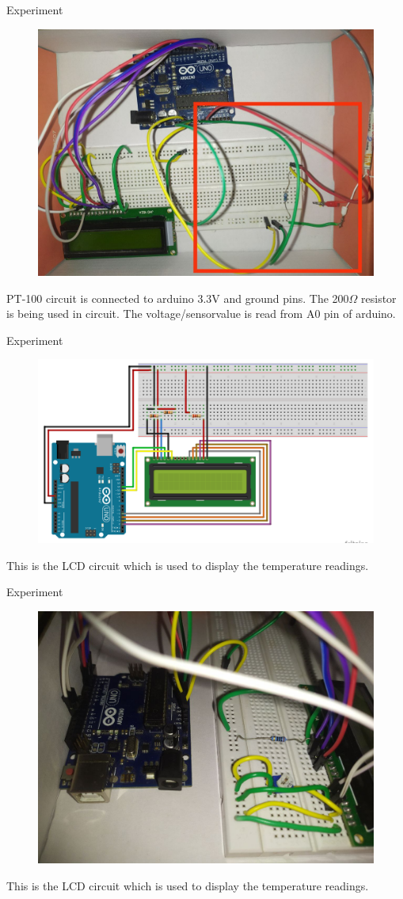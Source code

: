 \documentclass{beamer}
\theoremstyle{remark}
\begin{document}
\begin{frame}{Experiment}
    \begin{figure}[!ht]
         \centering
         \includegraphics[width=0.6\columnwidth]{figs/circuit.jpg}
     \end{figure}
     PT-100 circuit is connected to arduino 3.3V and ground pins. The 200$\Omega$ resistor is being used in circuit. The voltage/sensorvalue is read from A0 pin of arduino.
 \end{frame}

 \begin{frame}{Experiment}
    \begin{figure}[!ht]
         \centering
            \includegraphics[width=0.6\columnwidth]{figs/lcdcircuit.png}
     \end{figure}
        This is the LCD circuit which is used to display the temperature readings.
\end{frame}
\begin{frame}{Experiment}
    \begin{figure}[!ht]
         \centering
            \includegraphics[width=0.6\columnwidth]{figs/lcdsetup.jpg}
     \end{figure}
        This is the LCD circuit which is used to display the temperature readings.
\end{frame}
\end{document}
